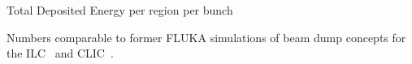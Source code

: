 \documentclass[xcolor={dvipsnames}]{beamer}
\begin{document}
\begin{frame}{Total Deposited Energy per region per bunch}

Numbers comparable to former FLUKA simulations of beam dump concepts for the ILC~\cite{NIM_paper} and CLIC~\cite{CLIC_dump}.
\end{frame}
\end{document}
